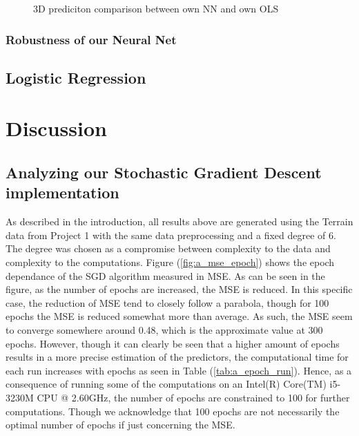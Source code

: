 \documentclass
[twocolumn,
secnumarabic,
nobibnotes,
aps,
prl,
reprint,
groupedaddress,
amsmath,
amssymb
]{revtex4-2}
\begin{document}
\begin{figure}[htb]
  \caption{3D prediciton comparison between own NN and own OLS \label{fig:3D_preds_NN_vs_OLS}}
\end{figure}


\subsubsection{Robustness of our Neural Net}

\subsection{Logistic Regression}

\section{Discussion}
\subsection{Analyzing our Stochastic Gradient Descent implementation}
As described in the introduction, all results above are generated using the Terrain data from Project 1 with the same data preprocessing and a fixed degree of 6. The degree was chosen as a compromise between complexity to the data and complexity to the computations.
Figure (\ref{fig:a_mse_epoch}) shows the epoch dependance of the SGD algorithm measured in MSE. As can be seen in the figure, as the number of epochs are increased, the MSE is reduced. In this specific case, the reduction of MSE tend to closely follow a parabola, though for 100 epochs the MSE is reduced somewhat more than average. As such, the MSE seem to converge somewhere around 0.48, which is the approximate value at 300 epochs. However, though it can clearly be seen that a higher amount of epochs results in a more precise estimation of the predictors, the computational time for each run increases with epochs as seen in Table (\ref{tab:a_epoch_run}). Hence, as a consequence of running some of the computations on an Intel(R) Core(TM) i5-3230M CPU @ 2.60GHz, the number of epochs are constrained to 100 for further computations. Though we acknowledge that 100 epochs are not necessarily the optimal number of epochs if just concerning the MSE.
\end{document}
